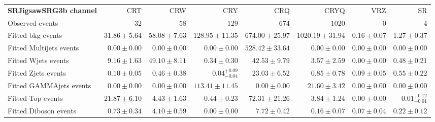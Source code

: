 

\begin{table}
\begin{center}
\setlength{\tabcolsep}{0.0pc}
{\tiny
\begin{tabular*}{\textwidth}{@{\extracolsep{\fill}}lrrrrrrr}
\noalign{\smallskip}\hline\noalign{\smallskip}
{\bf SRJigsawSRG3b channel}           & CRT            & CRW            & CRY            & CRQ            & CRYQ            & VRZ            & SR              \\[-0.05cm]
\noalign{\smallskip}\hline\noalign{\smallskip}
Observed events          & $32$              & $58$              & $129$              & $674$              & $1020$              & $0$              & $4$                    \\
\noalign{\smallskip}\hline\noalign{\smallskip}
Fitted bkg events         & $31.86 \pm 5.64$          & $58.08 \pm 7.63$          & $128.95 \pm 11.35$          & $674.00 \pm 25.97$          & $1020.19 \pm 31.94$          & $0.16 \pm 0.07$          & $1.27 \pm 0.37$              \\
\noalign{\smallskip}\hline\noalign{\smallskip}
        Fitted Multijets events         & $0.00 \pm 0.00$          & $0.00 \pm 0.00$          & $0.00 \pm 0.00$          & $528.42 \pm 33.64$          & $0.00 \pm 0.00$          & $0.00 \pm 0.00$          & $0.00 \pm 0.00$              \\
        Fitted Wjets events         & $9.16 \pm 1.63$          & $49.10 \pm 8.11$          & $0.34 \pm 0.30$          & $42.53 \pm 9.79$          & $3.57 \pm 2.59$          & $0.00 \pm 0.00$          & $0.48 \pm 0.21$              \\
        Fitted Zjets events         & $0.10 \pm 0.05$          & $0.46 \pm 0.38$          & $0.04_{-0.04}^{+0.09}$          & $23.03 \pm 6.52$          & $0.85 \pm 0.78$          & $0.09 \pm 0.05$          & $0.55 \pm 0.22$              \\
        Fitted GAMMAjets events         & $0.00 \pm 0.00$          & $0.00 \pm 0.00$          & $113.41 \pm 11.45$          & $0.00 \pm 0.00$          & $21.60 \pm 3.42$          & $0.00 \pm 0.00$          & $0.00 \pm 0.00$              \\
        Fitted Top events         & $21.87 \pm 6.10$          & $4.43 \pm 1.63$          & $0.44 \pm 0.23$          & $72.31 \pm 21.26$          & $3.84 \pm 1.24$          & $0.00 \pm 0.00$          & $0.01_{-0.01}^{+0.12}$              \\
        Fitted Diboson events         & $0.73 \pm 0.34$          & $4.10 \pm 0.59$          & $0.00 \pm 0.00$          & $7.72 \pm 0.42$          & $0.16 \pm 0.07$          & $0.07 \pm 0.04$          & $0.22 \pm 0.12$              \\

\end{tabular*}}
\end{center}
\end{table}
